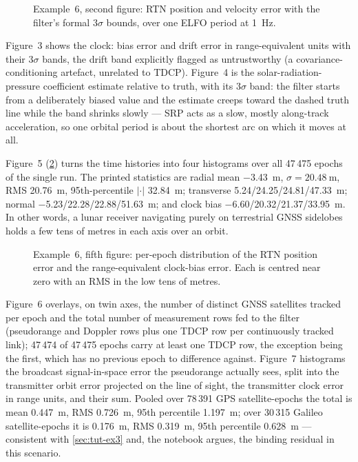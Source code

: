 \begin{figure}[htbp]
  \centering
  \caption{Example~6, second figure: RTN position and velocity error with the
           filter's formal $3\sigma$ bounds, over one ELFO period at
           \SI{1}{\hertz}.}
  \label{fig:tut-ex6-rtn}
\end{figure}

Figure~3 shows the clock: bias error and drift error in range-equivalent units
with their $3\sigma$ bands, the drift band explicitly flagged as untrustworthy
(a covariance-conditioning artefact, unrelated to TDCP). Figure~4 is the
solar-radiation-pressure coefficient estimate relative to truth, with its
$3\sigma$ band: the filter starts from a deliberately biased value and the
estimate creeps toward the dashed truth line while the band shrinks slowly ---
SRP acts as a slow, mostly along-track acceleration, so one orbital period is
about the shortest arc on which it moves at all.

Figure~5 (\cref{fig:tut-ex6-hist}) turns the time histories into four
histograms over all 47\,475 epochs of the single run. The printed statistics are
radial mean \SI{-3.43}{\meter}, $\sigma=\SI{20.48}{\meter}$, RMS
\SI{20.76}{\meter}, 95th-percentile $|{\cdot}|$ \SI{32.84}{\meter}; transverse
\SI{5.24}{}/\SI{24.25}{}/\SI{24.81}{}/\SI{47.33}{\meter}; normal
\SI{-5.23}{}/\SI{22.28}{}/\SI{22.88}{}/\SI{51.63}{\meter}; and clock bias
\SI{-6.60}{}/\SI{20.32}{}/\SI{21.37}{}/\SI{33.95}{\meter}. In other words, a
lunar receiver navigating purely on terrestrial GNSS sidelobes holds a few tens
of metres in each axis over an orbit.

\begin{figure}[htbp]
  \centering
  \caption{Example~6, fifth figure: per-epoch distribution of the RTN position
           error and the range-equivalent clock-bias error. Each is centred near
           zero with an RMS in the low tens of metres.}
  \label{fig:tut-ex6-hist}
\end{figure}

Figure~6 overlays, on twin axes, the number of distinct GNSS satellites tracked
per epoch and the total number of measurement rows fed to the filter (pseudorange
and Doppler rows plus one TDCP row per continuously tracked link); 47\,474 of
47\,475 epochs carry at least one TDCP row, the exception being the first, which
has no previous epoch to difference against. Figure~7 histograms the broadcast
signal-in-space error the pseudorange actually sees, split into the transmitter
orbit error projected on the line of sight, the transmitter clock error in range
units, and their sum. Pooled over 78\,391 GPS satellite-epochs the total is
mean \SI{+0.447}{\meter}, RMS \SI{0.726}{\meter}, 95th percentile
\SI{1.197}{\meter}; over 30\,315 Galileo satellite-epochs it is
\SI{+0.176}{\meter}, RMS \SI{0.319}{\meter}, 95th percentile \SI{0.628}{\meter}
--- consistent with \cref{sec:tut-ex3} and, the notebook argues, the binding
residual in this scenario.

